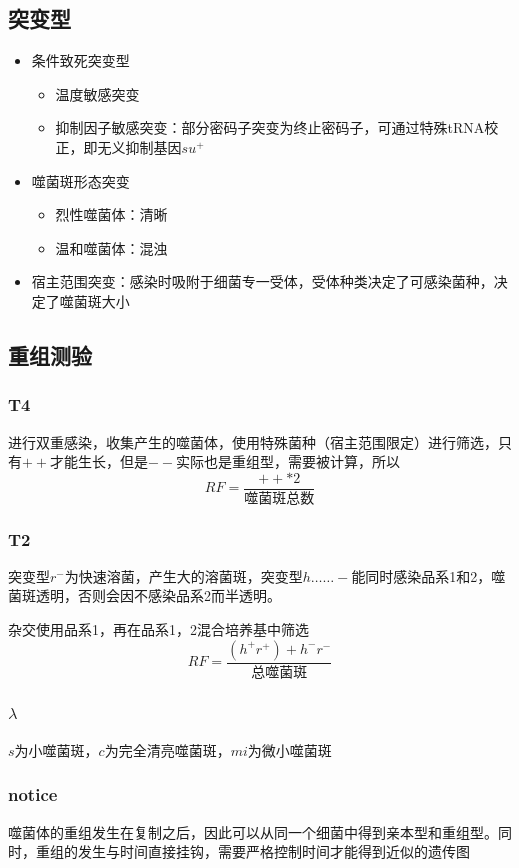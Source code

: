 \documentclass[a4paper, 12pt]{report}
\begin{document}
\subsection{突变型}
\begin{itemize}
    \item 条件致死突变型
          \begin{itemize}
              \item 温度敏感突变
              \item 抑制因子敏感突变：部分密码子突变为终止密码子，可通过特殊tRNA校正，即无义抑制基因\(su^+\)
          \end{itemize}
    \item 噬菌斑形态突变
          \begin{itemize}
              \item 烈性噬菌体：清晰
              \item 温和噬菌体：混浊
          \end{itemize}
    \item 宿主范围突变：感染时吸附于细菌专一受体，受体种类决定了可感染菌种，决定了噬菌斑大小
\end{itemize}
\subsection{重组测验}
\subsubsection{T4}
进行双重感染，收集产生的噬菌体，使用特殊菌种（宿主范围限定）进行筛选，只有\(++\)才能生长，但是\(--\)实际也是重组型，需要被计算，所以
\[
    RF=\dfrac{++*2}{\text{噬菌斑总数}}
\]
\subsubsection{T2}
突变型\(r^-\)为快速溶菌，产生大的溶菌斑，突变型\(h……-\)能同时感染品系1和2，噬菌斑透明，否则会因不感染品系2而半透明。

杂交使用品系1，再在品系1，2混合培养基中筛选
\[
    RF=\dfrac{(h^+r^+)+{h^-r^-}}{\text{总噬菌斑}}
\]
\subsubsection{\(\lambda\)}
\(s\)为小噬菌斑，\(c\)为完全清亮噬菌斑，\(mi\)为微小噬菌斑
\subsubsection{notice}
噬菌体的重组发生在复制之后，因此可以从同一个细菌中得到亲本型和重组型。同时，重组的发生与时间直接挂钩，需要严格控制时间才能得到近似的遗传图
\end{document}
